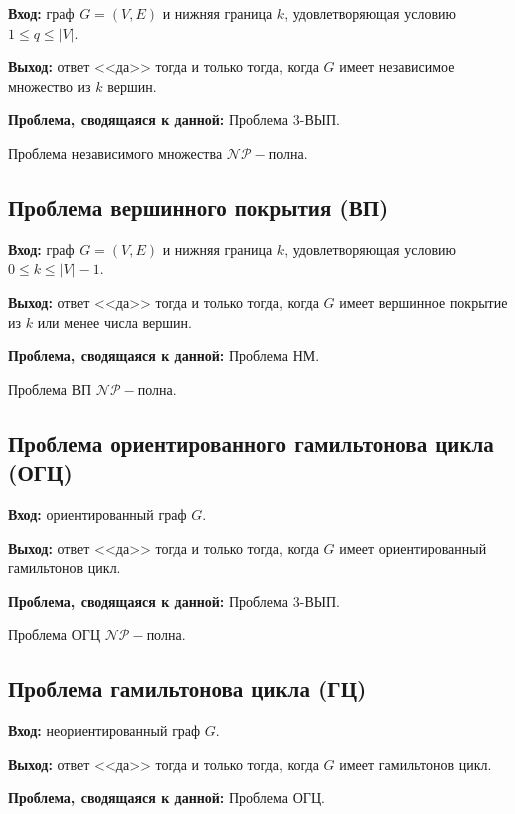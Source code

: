 \textbf{Вход:} граф $G=(V, E)$ и нижняя граница $k$, удовлетворяющая условию $1\leq q \leq |V|$.

\textbf{Выход:} ответ <<да>> тогда и только тогда, когда $G$ имеет независимое множество из $k$ вершин.

\textbf{Проблема, сводящаяся к данной:} Проблема 3-ВЫП.

\begin{corollary}
    Проблема независимого множества $\mathscr{NP-}$полна.
\end{corollary}

\subsection*{Проблема вершинного покрытия (ВП)}
\textbf{Вход:} граф $G=(V,E)$ и нижняя граница $k$, удовлетворяющая условию $0\leq k\leq |V|-1$.

\textbf{Выход:} ответ <<да>> тогда и только тогда, когда $G$ имеет вершинное покрытие из $k$ или менее числа вершин.

\textbf{Проблема, сводящаяся к данной:} Проблема НМ.

\begin{corollary}
    Проблема ВП $\mathscr{NP-}$полна.
\end{corollary}

\subsection*{Проблема ориентированного гамильтонова цикла (ОГЦ)}
\textbf{Вход:} ориентированный граф $G$.

\textbf{Выход:} ответ <<да>> тогда и только тогда, когда $G$ имеет ориентированный гамильтонов цикл.

\textbf{Проблема, сводящаяся к данной:} Проблема 3-ВЫП.

\begin{corollary}
    Проблема ОГЦ $\mathscr{NP-}$полна.
\end{corollary}

\subsection*{Проблема гамильтонова цикла (ГЦ)}
\textbf{Вход:} неориентированный граф $G$.

\textbf{Выход:} ответ <<да>> тогда и только тогда, когда $G$ имеет гамильтонов цикл.

\textbf{Проблема, сводящаяся к данной:} Проблема ОГЦ.

